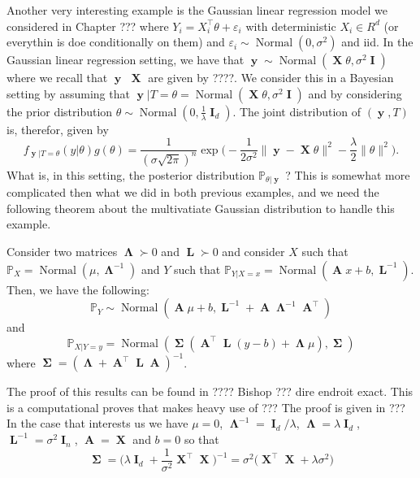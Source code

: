 \documentclass[
	fontsize=11pt, %
	twoside=false, %
	numbers=noenddot, %
]{kaobook}
\DeclareMathOperator{\bA}{{\boldsymbol A}}
\DeclareMathOperator{\bI}{{\boldsymbol I}}
\DeclareMathOperator{\bL}{{\boldsymbol L}}
\DeclareMathOperator{\bX}{{\boldsymbol X}}
\DeclareMathOperator{\by}{{\boldsymbol y}}
\DeclareMathOperator{\bLambda}{{\boldsymbol \Lambda}}
\DeclareMathOperator{\bSigma}{\boldsymbol \Sigma}
\DeclareMathOperator{\nor}{Normal}
\newcommand{\eps}{\varepsilon}
\renewcommand{\P}{\mathbb P}
\newcommand{\norm}[1]{\|#1\|}
\begin{document}
Another very interesting example is the Gaussian linear regression model we considered in Chapter ??? where
$Y_i = X_i^\top \theta + \eps_i$ with deterministic $X_i \in R^d$ (or everythin is doe conditionally on them) and $\eps_i \sim \nor(0, \sigma^2)$ and iid.
In the Gaussian linear regression setting, we have that $\by \sim \nor(\bX \theta, \sigma^2 \bI)$ where we recall that $\by$ $\bX$ are given by ????.
We consider this in a Bayesian setting by assuming that $\by | T = \theta = \nor(\bX \theta, \sigma^2 \bI)$ and by considering the prior distribution $\theta \sim \nor(0, \frac{1}{\lambda} \bI_d)$.
The joint distribution of $(\by, T)$ is, therefor, given by
\begin{equation*}
	f_{\by | T = \theta}(y | \theta) g(\theta) = \frac{1}{(\sigma \sqrt{2 \pi})^{n}} 
	\exp \Big( -\frac{1}{2 \sigma^2} \norm{\by - \bX \theta}^2 - \frac {\lambda}{2} \norm{\theta}^2 \Big).
\end{equation*}
What is, in this setting, the posterior distribution $\P_{\theta | \by}$ ?
This is somewhat more complicated then what we did in both previous examples, and we need the following theorem about the multivatiate Gaussian distribution to handle this example.
\begin{theorem}
	Consider two matrices $\bLambda \succ 0$ and $\bL \succ 0$ and consider 
	$X$ such that $\P_X = \nor(\mu, \bLambda^{-1})$ and $Y$ such that $\P_{Y | X = x} = \nor(\bA x + b, \bL^{-1})$. Then, we have the following:
	\begin{equation*}
		\P_Y \sim \nor( \bA \mu + b, \bL^{-1} + \bA \bLambda^{-1} \bA^\top)		
	\end{equation*}
	and
	\begin{equation*}
		\P_{X | Y = y} = \nor(\bSigma (\bA^\top \bL (y - b) + \bLambda \mu), \bSigma)
	\end{equation*}
	where $\bSigma = (\bLambda + \bA^\top \bL \bA)^{-1}$.
\end{theorem}
The proof of this results can be found in ???? Bishop ??? dire endroit exact.
This is a computational proves that makes heavy use of ???
 The proof is given in ???
In the case that interests us we have $\mu = 0$, $\bLambda^{-1} = \bI_d / \lambda$, $\bLambda = \lambda \bI_d$, $\bL^{-1} = \sigma^2 \bI_n$, $\bA = \bX$ and $b = 0$ so that
\begin{equation*}
	\bSigma = \Big( \lambda \bI_d + \frac{1}{\sigma^2} \bX^\top \bX \Big)^{-1} = \sigma^2 \Big( \bX^\top \bX  + \lambda \sigma^2 \Big)
\end{equation*}
\end{document}
